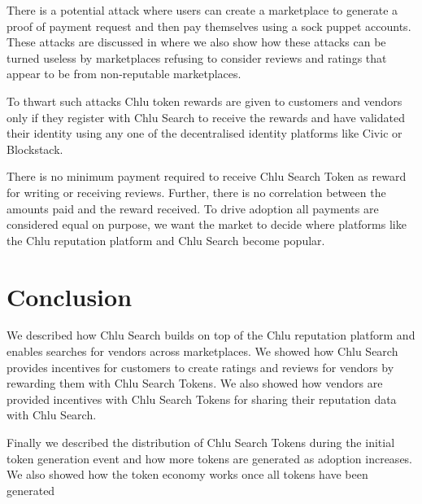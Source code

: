 \documentclass[a4paper]{article}
\begin{document}
There is a potential attack where users can create a marketplace to
generate a proof of payment request and then pay themselves using a
sock puppet accounts. These attacks are discussed in
\cite{chlu-reputation} where we also show how these attacks can be
turned useless by marketplaces refusing to consider reviews and
ratings that appear to be from non-reputable marketplaces.

To thwart such attacks Chlu token rewards are given to customers and
vendors only if they register with Chlu Search to receive the rewards
and have validated their identity using any one of the decentralised
identity platforms like Civic\cite{civic} or
Blockstack\cite{blockstack}.

There is no minimum payment required to receive Chlu Search Token as
reward for writing or receiving reviews. Further, there is no
correlation between the amounts paid and the reward received. To drive
adoption all payments are considered equal on purpose, we want the
market to decide where platforms like the Chlu reputation platform and
Chlu Search become popular.

\section{Conclusion}

We described how Chlu Search builds on top of the Chlu reputation
platform and enables searches for vendors across marketplaces. We
showed how Chlu Search provides incentives for customers to create
ratings and reviews for vendors by rewarding them with Chlu Search
Tokens. We also showed how vendors are provided incentives with Chlu
Search Tokens for sharing their reputation data with Chlu Search.

Finally we described the distribution of Chlu Search Tokens during the
initial token generation event and how more tokens are generated as
adoption increases. We also showed how the token economy works once
all tokens have been generated

\medskip
 


\end{document}
